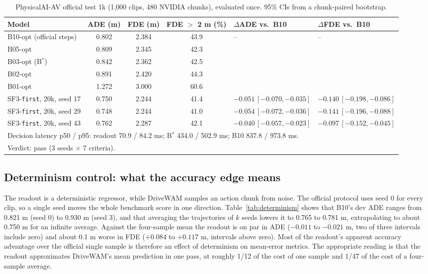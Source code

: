 \documentclass[10pt]{article}
\newcommand{\Bstar}{B$^{*}$}
\newcommand{\first}{\texttt{first}}
\begin{document}
\begin{table}[t]
\caption{PhysicalAI-AV official test 1k (1,000 clips, 480 NVIDIA chunks), evaluated once. 95\% CIs from a chunk-paired bootstrap.}
\label{tab:pai-final}
\begin{center}
\footnotesize
\setlength{\tabcolsep}{3pt}
\begin{tabular}{lcccll}
\toprule
Model & ADE (m) & FDE (m) & FDE $>$ 2 m (\%) & $\Delta$ADE vs.\ B10 & $\Delta$FDE vs.\ B10 \\
\midrule
B10-opt (official steps) & 0.802 & 2.384 & 43.9 & -- & -- \\
B05-opt & 0.809 & 2.345 & 42.3 & & \\
B03-opt (\Bstar{}) & 0.842 & 2.362 & 42.5 & & \\
B02-opt & 0.891 & 2.420 & 44.3 & & \\
B01-opt & 1.272 & 3.000 & 60.6 & & \\
SF3-\first{}, 20k, seed 17 & 0.750 & 2.244 & 41.4 & $-0.051\,[-0.070,-0.035]$ & $-0.140\,[-0.198,-0.086]$ \\
SF3-\first{}, 20k, seed 29 & 0.748 & 2.244 & 41.0 & $-0.054\,[-0.072,-0.036]$ & $-0.141\,[-0.196,-0.088]$ \\
SF3-\first{}, 20k, seed 43 & 0.762 & 2.287 & 42.1 & $-0.040\,[-0.057,-0.023]$ & $-0.097\,[-0.152,-0.045]$ \\
\midrule
\multicolumn{6}{l}{Decision latency p50 / p95: readout 70.9 / 84.2 ms; \Bstar{} 434.0 / 502.9 ms; B10 837.8 / 973.8 ms.} \\
\multicolumn{6}{l}{Verdict: pass (3 seeds $\times$ 7 criteria).} \\
\bottomrule
\end{tabular}
\end{center}
\end{table}

\subsection{Determinism control: what the accuracy edge means}
\label{sec:determinism}

The readout is a deterministic regressor, while DriveWAM samples an action chunk from noise. The official protocol uses seed 0 for every clip, so a single seed moves the whole benchmark score in one direction. Table~\ref{tab:determinism} shows that B10's dev ADE ranges from 0.821 m (seed 0) to 0.930 m (seed 3), and that averaging the trajectories of $k$ seeds lowers it to 0.765 to 0.781 m, extrapolating to about 0.750 m for an infinite average. Against the four-sample mean the readout is on par in ADE ($-0.011$ to $-0.021$ m, two of three intervals include zero) and about 0.1 m worse in FDE ($+0.084$ to $+0.117$ m, intervals above zero). Most of the readout's apparent accuracy advantage over the official single sample is therefore an effect of determinism on mean-error metrics. The appropriate reading is that the readout approximates DriveWAM's mean prediction in one pass, at roughly 1/12 of the cost of one sample and 1/47 of the cost of a four-sample average.
\end{document}
